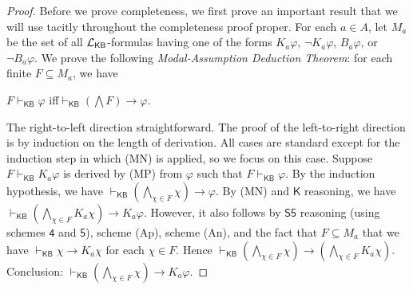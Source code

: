 \documentclass[12pt]{article}
\theoremstyle{definition}
\newcommand{\Lang}{{\cal L}}   %
\newcommand{\KB}{{\mathsf{KB}}}                        %
\begin{document}
\begin{proof}
  Before we prove completeness, we first prove an important result
  that we will use tacitly throughout the completeness proof
  proper. For each $a\in A$, let $M_a$ be the set of all
  $\Lang_\KB$-formulas having one of the forms $K_a\varphi$, $\lnot
  K_a\varphi$, $B_a\varphi$, or $\lnot B_a\varphi$.  We prove the
  following \emph{Modal-Assumption Deduction Theorem\/}: for each
  finite $F\subseteq M_a$, we have
  \begin{center}
    $F\vdash_\KB\varphi$ \quad{}iff\quad $\vdash_\KB(\bigwedge
    F)\to\varphi$\enspace.
  \end{center}
  The right-to-left direction straightforward. The proof of the
  left-to-right direction is by induction on the length of derivation.
  All cases are standard except for the induction step in which (MN)
  is applied, so we focus on this case.  Suppose $F\vdash_\KB
  K_a\varphi$ is derived by (MP) from $\varphi$ such that
  $F\vdash_\KB\varphi$. By the induction hypothesis, we have
  $\vdash_\KB (\bigwedge_{\chi\in F}\chi)\to\varphi$.  By (MN) and
  $\mathsf{K}$ reasoning, we have $\vdash_\KB (\bigwedge_{\chi\in
    F}K_a\chi)\to K_a\varphi$.  However, it also follows by
  $\mathsf{S5}$ reasoning (using schemes $\mathsf{4}$ and
  $\mathsf{5}$), scheme (Ap), scheme (An), and the fact that
  $F\subseteq M_a$ that we have $\vdash_\KB\chi\to K_a\chi$ for each
  $\chi\in F$.  Hence $\vdash_\KB(\bigwedge_{\chi\in
    F}\chi)\to(\bigwedge_{\chi\in F}K_a\chi)$. Conclusion:
  $\vdash_\KB(\bigwedge_{\chi\in F}\chi)\to K_a\varphi$.


\end{proof}
\end{document}

